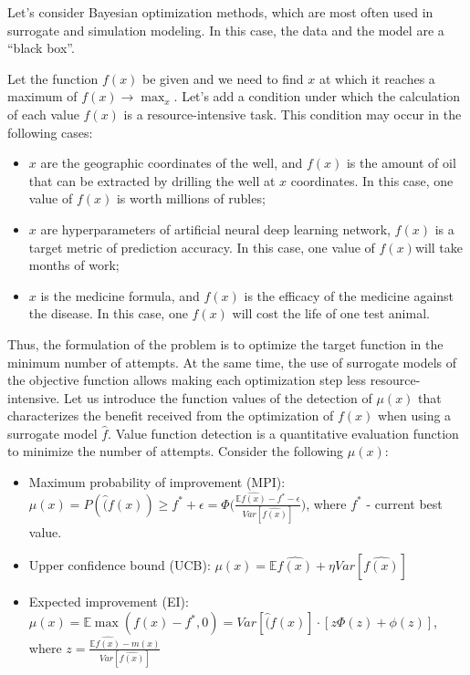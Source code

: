 \documentclass[12pt]{report}
\theoremstyle{definition}
\begin{document}
Let's consider Bayesian optimization methods, which are most often used in surrogate and simulation modeling. In this case, the data and the model are a ``black box''.

Let the function $f \left( x \right)$ be given and we need to find $x$ at which it reaches a maximum of $f \left( x \right) \longrightarrow \max_x$. Let's add a condition under which the calculation of each value $f \left( x \right)$ is a resource-intensive task. 
This condition may occur in the following cases:

\begin{itemize}
	\item $x$ are the geographic coordinates of the well, and $f \left( x \right)$ is the amount of oil that can be extracted by drilling the well at $x$ coordinates. 
	In this case, one value of $f \left( x \right)$ is worth millions of rubles;
	\item $x$ are hyperparameters of artificial neural deep learning network, $f \left( x \right)$ is a target metric of prediction accuracy. 
	In this case, one value of $f  \left(  x \right) $will take months of work;
	\item $x$ is the medicine formula, and $f \left( x \right)$ is the efficacy of the medicine against the disease. 
	In this case, one $f \left( x \right)$ will cost the life of one test animal.
\end{itemize}

Thus, the formulation of the problem is to optimize the target function in the minimum number of attempts. 
At the same time, the use of surrogate models of the objective function allows making each optimization step less resource-intensive. 
Let us introduce the function values of the detection of $\mu \left( x \right)$ that characterizes the benefit received from the optimization of $f \left( x \right)$ when using a surrogate model $\hat{f}$. 
Value function detection is a quantitative evaluation function to minimize the number of attempts. 
Consider the following $\mu \left( x \right)$:

\begin{itemize}
	\item Maximum probability of improvement (MPI): $ \mu \left(  x \right)  = P(\hat(f \left(  x \right) ) \geq f^* + \epsilon =  \Phi \bigg( \frac{\mathbb{E}\hat{f \left(  x \right) } - f^* -\epsilon}{Var[\hat{f \left(  x \right) }]}\bigg) $, where $f^*$ - current best value.
	\item Upper confidence bound (UCB): $ \mu \left(  x \right)  = \mathbb{E}\hat{f \left(  x \right) } + \eta Var[\hat{f \left(  x \right) }] $
	\item Expected improvement (EI): $ \mu \left(  x \right)  = \mathbb{E} \max(f \left(  x \right)  - f^*,0)  = Var[\hat(f \left(  x \right) ] \cdot [z \Phi (z) + \phi(z)]$, where $z = \frac{\mathbb{E}\hat{f \left(  x \right) } - m \left(  x \right) }{Var[\hat{f \left(  x \right) }]}$
\end{itemize}
\end{document}
